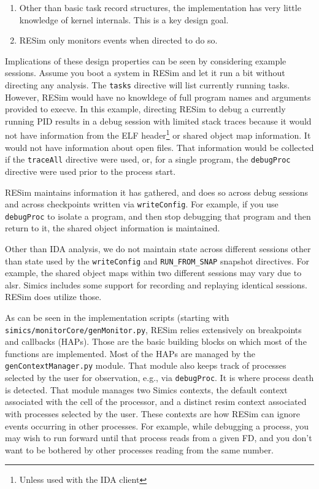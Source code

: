\documentclass[titlepage]{article}
\begin{document}
\begin{enumerate}
\item Other than basic task record structures, the implementation has very little knowledge of kernel internals.
This is a key design goal.  
\item RESim only monitors events when directed to do so.
\end{enumerate}
\noindent Implications of these design properties can be seen by considering example sessions.  Assume you boot a system in RESim and let it run a bit without
directing any analysis.  The {\tt tasks} directive will list currently running tasks.  However, RESim would have no knowldege of full program names and arguments
provided to execve.  In this example, directing RESim to debug a currently running PID results in a debug session with limited stack traces because
it would not have information from the ELF header\footnote{Unless used with the IDA client}  or shared object map information.  It would not have
information about open files.
That information would be collected if the {\tt traceAll} directive were used, or, for a single program, the {\tt debugProc} directive were used prior to the
process start.

RESim maintains information it has gathered, and does so across debug sessions and across checkpoints written via {\tt writeConfig}.  For example, if you
use {\tt debugProc} to isolate a program, and then stop debugging that program and then return to it, the shared object information is maintained.

Other than IDA analysis, we do not maintain state across different sessions other than state used by the {\tt writeConfig} and {\tt RUN\_FROM\_SNAP} snapshot directives.
For example, the shared object maps within two different sessions may vary due to alsr.  Simics includes some support for recording and replaying identical sessions.  
RESim does utilize those.

As can be seen in the implementation scripts (starting with {\tt simics/monitorCore/genMonitor.py}, RESim relies extensively on breakpoints and callbacks (HAPs).  
Those are the basic building blocks on which most of the functions are implemented.  Most of the HAPs are managed by the {\tt genContextManager.py} module.  That module also
keeps track of processes selected by the user for observation, e.g., via {\tt debugProc}.  It is where process death is detected.  That module manages two Simics contexts,
the default context associated with the cell of the processor, and a distinct resim context associated with processes selected by the user.  These contexts are how RESim can 
ignore events occurring in other processes.  For example, while debugging a process, you may wish to run forward until that process reads from a given FD, and you don't want
to be bothered by other processes reading from the same number.
\end{document}
